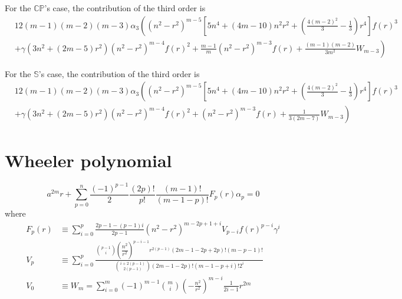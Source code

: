 For the $\mathbb{CP}$'s case, the contribution of the third order is
\begin{align*}
    &12(m-1)(m-2)(m-3)\alpha_3\left((n^2-r^2)^{m-5}[5n^4+(4m-10)n^2r^2+\left(\frac{4(m-2)^2}{3}-\frac{1}{3}\right)r^4]f(r)^3\right.\\&+\left.\gamma(3n^2+(2m-5)r^2)(n^2-r^2)^{m-4}f(r)^2+\frac{m-1}{m}(n^2-r^2)^{m-3}f(r)+\frac{(m-1)(m-2)}{3m^2}W_{m-3}\right)
\end{align*}

For the $\mathbb{S}$'s case, the contribution of the third order is
\begin{align*}
    &12(m-1)(m-2)(m-3)\alpha_3\left((n^2-r^2)^{m-5}[5n^4+(4m-10)n^2r^2+\left(\frac{4(m-2)^2}{3}-\frac{1}{3}\right)r^4]f(r)^3\right.\\&+\left.\gamma(3n^2+(2m-5)r^2)(n^2-r^2)^{m-4}f(r)^2+(n^2-r^2)^{m-3}f(r)+\frac{1}{3(2m-7)}W_{m-3}\right)
\end{align*}

\section{Wheeler polynomial}
\begin{equation}
  a^{2m}r+\sum_{p=0}^n\frac{(-1)^{p-1}}{2}\frac{(2p)!}{p!}\frac{(m-1)!}{(m-1-p)!}F_p(r)\alpha_p=0
\end{equation}
where
\begin{align}
  F_p(r)&\equiv \sum_{i=0}^p\frac{2p-1-(p-1)i}{2p-1}(n^2-r^2)^{m-2p+1+i}V_{p-i}f(r)^{p-i}\gamma^{i}\\
  V_p&\equiv \sum_{i=0}^p\frac{\binom{p-1}{i}\left(\dfrac{n^2}{r^2}\right)^{p-i-1}r^{2(p-1)}(2m-1-2p+2p)!(m-p-1)!}{\binom{i+2(p-1)}{2(p-1)}(2m-1-2p)!(m-1-p+i)!2^{i}}\\
  V_0&\equiv W_m=\sum_{i=0}^m(-1)^{m-1}\binom{m}{i}\left(-\frac{n^2}{r^2}\right)^{m-i}\frac{1}{2i-1}r^{2m}
\end{align}
































